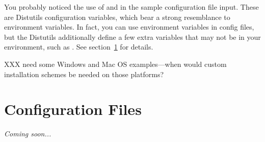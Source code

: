 \documentclass{howto}
\newcommand{\comingsoon}{\emph{Coming soon...}}
\begin{document}
You probably noticed the use of  and  in the
sample configuration file input.  These are Distutils configuration
variables, which bear a strong resemblance to environment variables.  In
fact, you can use environment variables in config files, but the
Distutils additionally define a few extra variables that may not be in
your environment, such as .  See
section~\ref{sec:config-files} for details.

XXX need some Windows and Mac OS examples---when would custom
installation schemes be needed on those platforms?



\section{Configuration Files}
\label{sec:config-files}

\comingsoon
\end{document}
